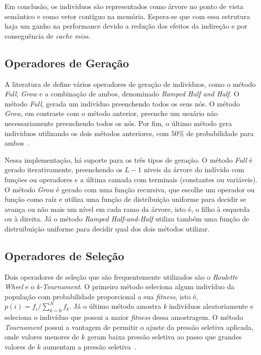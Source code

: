 \documentclass[a4paper]{paper}
\begin{document}
Em conclusão, os indivíduos são representados como árvore no ponto de vista
semântico e como vetor contíguo na memória.  Espera-se que com essa estrutura
haja um ganho na performance devido a redução dos efeitos da indireção e por
conseguência de \textit{cache miss}.

\subsection{Operadores de Geração} \label{subsec:generation}

A literatura de define vários operadores de geração de indivíduos, como o método
\textit{Full}, \textit{Grow} e a combinação de ambos, denominado \textit{Ramped
  Half and Half}. O método \textit{Full}, gerada um indivíduo preenchendo todos os
seus nós. O método \textit{Grow}, em contraste com o método anterior, preenche
um usuário não necessariamente preenchendo todos os nós. Por fim, o último método
gera individuos utilizando os dois métodos anteriores, com 50\% de probabilidade
para ambos~\citep{poli2008}.

Nessa implementação, há suporte para os três tipos de geração. O método
\textit{Full} é gerado iterativamente, preenchendo os $L-1$ niveis da árvore do
indívido com funções ou operadores e a última camada com terminais (constantes
ou variáveis).  O método \textit{Grow} é gerado com uma função recursiva, que
escolhe um operador ou função como raíz e utiliza uma função de distribuição
uniforme para decidir se avança ou não mais um nível em cada ramo da árvore,
isto é, o filho à esquerda ou à direita. Já o método \textit{Ramped
  Half-and-Half} utiliza também uma função de distruibuição uniforme para
decidir qual dos dois métodos utilizar.

\subsection{Operadores de Seleção} \label{subsec:selection}

Dois operadores de seleção que são frequentemente utilizados são o
\textit{Roulette Wheel} e o \textit{k-Tournament}. O primeiro método seleciona
algum indivíduo da população com probabilidade proporcional a sua
\textit{fitness}, isto é, $p(i)=f_i/\sum_{k=0}^{N}f_k$. Já o último método
amostra \textit{k} indivíduos aleatoriamente e seleciona o indivíduo que possui
a maior \textit{fitness} dessa amostragem. O método \textit{Tournament} possui
a vantagem de permitir o ajuste da pressão seletiva aplicada, onde valores
menores de $k$ geram baixa pressão seletiva ao passo que grandes valores de $k$
aumentam a pressão seletiva~\citep{Baeck1994}.
\end{document}
